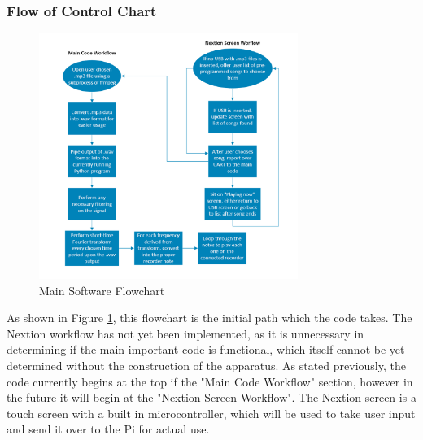 \documentclass[UTF8, 12pt]{article}
\begin{document}
\subsubsection{Flow of Control Chart}
    \begin{figure}[h]
        \centering
        \includegraphics[width=0.75\textwidth]{flowchart}
        \caption{Main Software Flowchart}
        \label{fc}
    \end{figure}
    As shown in Figure \ref{fc}, this flowchart is the initial path which the code takes. The Nextion workflow has not yet been implemented, as it is unnecessary in determining if the main important code is functional, which itself cannot be yet determined without the construction of the apparatus. As stated previously, the code currently begins at the top if the "Main Code Workflow" section, however in the future it will begin at the "Nextion Screen Workflow". The Nextion screen is a touch screen with a built in microcontroller, which will be used to take user input and send it over to the Pi for actual use. 
\end{document}
